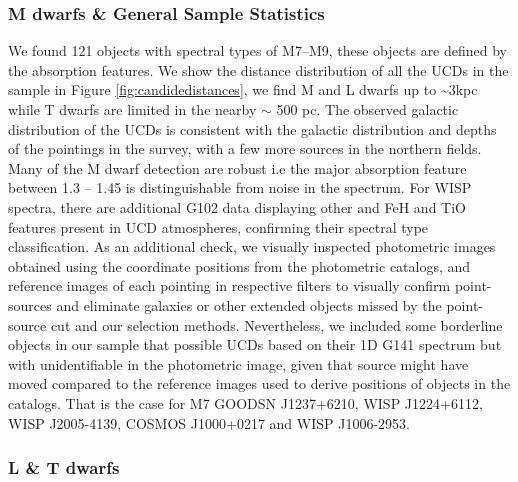\documentclass[manuscript]{aastex63}
\begin{document}
\subsubsection{M dwarfs \& General Sample Statistics}
We found 121 objects with spectral types of M7--M9, these objects are defined by the \wat absorption features. We show the distance distribution of all the UCDs in the sample in Figure \ref{fig:candidedistances}, we find M and L dwarfs up to \sim 3kpc while T dwarfs are limited in the nearby $\sim$ 500 pc. The observed galactic distribution of the UCDs is consistent with the galactic distribution and depths of the pointings in the survey, with a few more sources in the northern fields. Many of the M dwarf detection are robust i.e the major \wat absorption feature between 1.3 -- 1.45 \micron is distinguishable from noise in the spectrum. For WISP spectra, there are additional G102 data displaying other \wat and FeH and TiO features present in UCD atmospheres, confirming their spectral type classification. As an additional check, we visually inspected photometric images obtained using the coordinate positions from the photometric catalogs, and reference images of each pointing in respective filters to visually confirm point-sources and eliminate galaxies or other extended objects missed by the point-source cut and our selection methods. Nevertheless, we included some borderline objects in our sample that possible UCDs based on their 1D G141 spectrum but with unidentifiable in the photometric image, given that source might have moved compared to the reference images used to derive positions of objects in the catalogs. That is the case for M7 GOODSN J1237+6210,  WISP J1224+6112, WISP J2005-4139, COSMOS J1000+0217 and WISP J1006-2953.

\subsubsection{ L \& T dwarfs}
\end{document}
